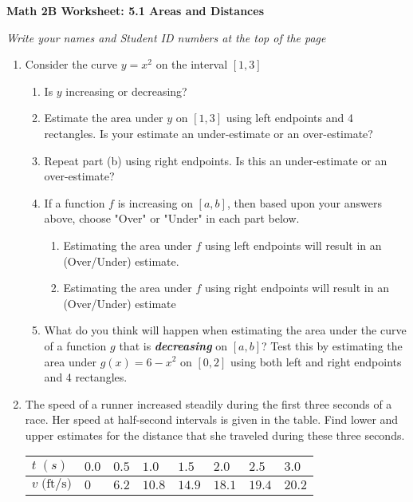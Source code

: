 \documentclass[12pt]{article}
\begin{document}
\begin{center}
	\textbf{Math 2B Worksheet: 5.1 Areas and Distances}
\end{center}

\emph{Write your names and Student ID numbers at the top of the page}


\begin{enumerate}
\item Consider the curve $y=x^2$ on the interval $[1,3]$
\begin{enumerate}
	\item Is $y$ increasing or decreasing?\\
	
	\vspace{1cm}
	
	\item Estimate the area under $y$ on $[1,3]$ using left endpoints and 4 rectangles.  Is your estimate an under-estimate or an over-estimate?\\
	
	\vfill
	
	\item Repeat part (b) using right endpoints.  Is this an under-estimate or an over-estimate?\\
	
	\vfill
	
	\item If a function $f$ is increasing on $[a,b]$, then based upon your answers above, choose "Over" or "Under" in each part below.
	\begin{enumerate}
		\item Estimating the area under $f$ using left endpoints will result in an (Over/Under) estimate.
		\item Estimating the area under $f$ using right endpoints will result in an (Over/Under) estimate
	\end{enumerate}
	
	
	\newpage
	
	\item  What do you think will happen when estimating the area under the curve of a function $g$ that is \textbf{\textit{decreasing}} on $[a,b]$? Test this by estimating the area under $g(x)=6-x^2$ on $[0,2]$ using both left and right endpoints and 4 rectangles.
\end{enumerate}

\vfill

\item The speed of a runner increased steadily during the first
three seconds of a race. Her speed at half-second intervals
is given in the table. Find lower and upper estimates for
the distance that she traveled during these three seconds.
\\
\vspace{.5cm}
\begin{tabular}{| p{2cm} | p{.75cm}| p{.75cm}|p{.75cm}|p{.75cm}|p{.75cm}|p{.75cm}|p{.75cm}|}
	\hline
	$t\; (s)$ & $0.0$ & $0.5$ & $1.0$ & $1.5$ & $2.0$ & $2.5$ & $3.0$ \\
	\hline
	$v\;\text{(ft/s)}$ & $0$ & $6.2$ & $10.8$ & $14.9$ & $18.1$ & $19.4$ & $20.2$ \\
	\hline
	\end {tabular}
	

\end{enumerate}
\end{document}

